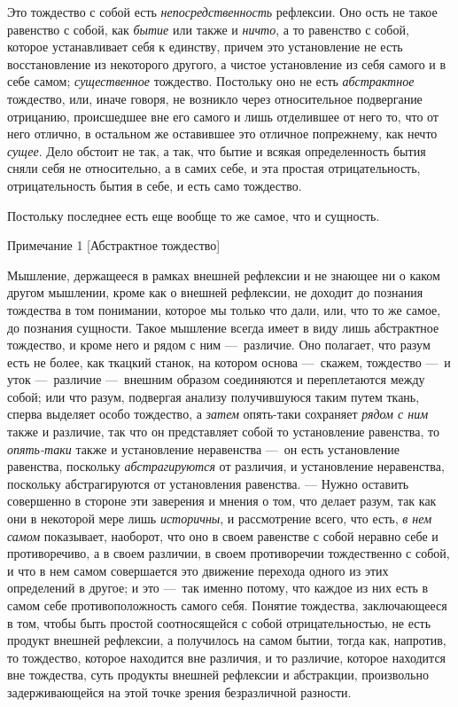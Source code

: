 Это тождество с собой есть {\em непосредственность}
рефлексии. Оно ость не такое равенство с собой, как
{\em бытие} или также и
{\em ничто}, а то равенство с собой, которое
устанавливает себя к единству, причем это установление не есть
восстановление из некоторого другого, а чистое установление из себя самого
и в себе самом; {\em существенное} тождество. Постольку
оно не есть {\em абстрактное} тождество, или, иначе
говоря, не возникло через относительное подвергание отрицанию, происшедшее
вне его самого и лишь отделившее от него то, что от него отлично, в
остальном же оставившее это отличное попрежнему, как нечто
{\em сущее}. Дело обстоит не так, а так, что бытие и
всякая определенность бытия сняли себя не относительно, а в самих себе, и
эта простая отрицательность, отрицательность бытия в себе, и есть само
тождество.

Постольку последнее есть еще вообще то же самое, что и сущность.

{\centering
Примечание 1
[Абстрактное тождество]
\par}

Мышление, держащееся в рамках внешней рефлексии и не знающее ни о каком
другом мышлении, кроме как о внешней рефлексии, не доходит до познания
тождества в том понимании, которое мы только что дали, или, что то же
самое, до познания сущности. Такое мышление всегда имеет в виду лишь
абстрактное тождество, и кроме него и рядом с ним —~различие. Оно полагает,
что разум есть не более, как ткацкий станок, на котором основа —~скажем,
тождество —~и уток —~различие —~внешним образом соединяются и переплетаются
между собой; или что разум, подвергая анализу получившуюся таким путем
ткань, сперва выделяет особо тождество, а {\em затем}
опять-таки сохраняет {\em рядом с ним} также и
различие, так что он представляет собой то установление равенства, то
{\em опять-таки} также и установление неравенства —~он
есть установление равенства, поскольку
{\em абстрагируются} от различия, и установление
неравенства, поскольку абстрагируются от установления равенства. — Нужно
оставить совершенно в стороне эти заверения и мнения о том, что делает
разум, так как они в некоторой мере лишь
{\em историчны}, и рассмотрение всего, что есть,
{\em в нем самом} показывает, наоборот, что оно в своем
равенстве с собой неравно себе и противоречиво, а в своем различии, в своем
противоречии тождественно с собой, и что в нем самом совершается это
движение перехода одного из этих определений в другое; и это —~так именно
потому, что каждое из них есть в самом себе противоположность самого себя.
Понятие тождества, заключающееся в том, чтобы быть простой соотносящейся с
собой отрицательностью, не есть продукт внешней рефлексии, а получилось на
самом бытии, тогда как, напротив, то тождество, которое находится вне
различия, и то различие, которое находится вне тождества, суть продукты
внешней рефлексии и абстракции, произвольно задерживающейся на этой точке
зрения безразличной разности.


